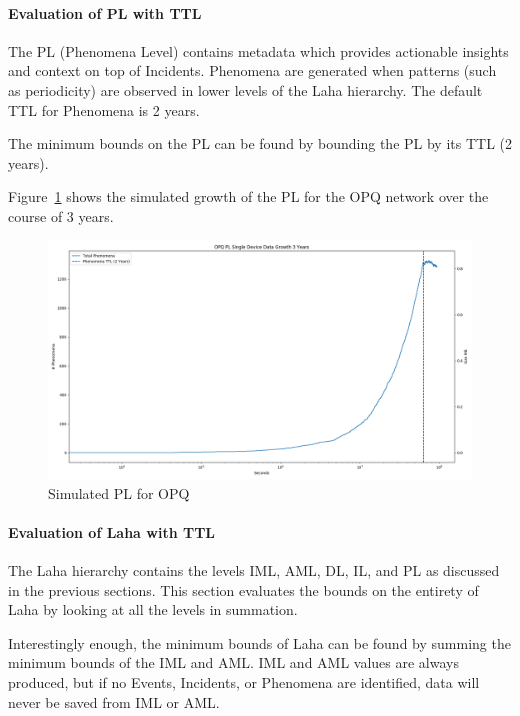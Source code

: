 \paragraph{Evaluation of PL with TTL}

The PL (Phenomena Level) contains metadata which provides actionable insights and context on top of Incidents. Phenomena are generated when patterns (such as periodicity) are observed in lower levels of the Laha hierarchy. The default TTL for Phenomena is 2 years.

The minimum bounds on the PL can be found by bounding the PL by its TTL (2 years).

Figure~\ref{fig:sim_pl_opq} shows the simulated growth of the PL for the OPQ network over the course of 3 years.

\begin{figure}[H]
	\centering
	\includegraphics[width=\linewidth]{figures/sim_pl_opq.png}
	\caption{Simulated PL for OPQ}
	\label{fig:sim_pl_opq}
\end{figure}

\paragraph{Evaluation of Laha with TTL}

The Laha hierarchy contains the levels IML, AML, DL, IL, and PL as discussed in the previous sections. This section evaluates the bounds on the entirety of Laha by looking at all the levels in summation.

Interestingly enough, the minimum bounds of Laha can be found by summing the minimum bounds of the IML and AML. IML and AML values are always produced, but if no Events, Incidents, or Phenomena are identified, data will never be saved from IML or AML\@.

